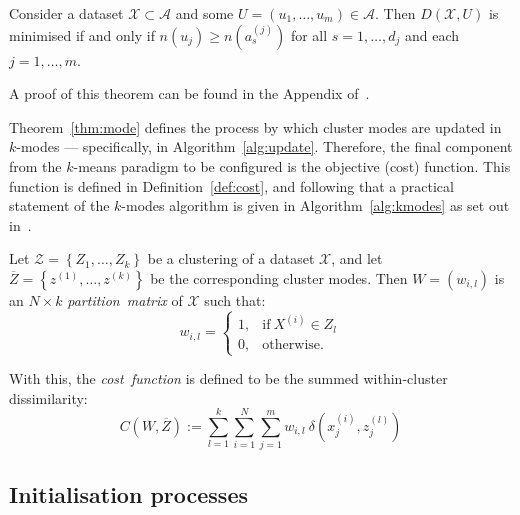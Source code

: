 \begin{theorem}\label{thm:mode}
    Consider a dataset \(\mathcal{X} \subset \mathcal{A}\) and some \(U = (u_1,
    \ldots, u_m) \in \mathcal{A}\). Then \(D(\mathcal{X}, U)\) is minimised if
    and only if \(n\left(u_j\right) \geq n\left(a_s^{(j)}\right)\) for all
    \(s=1, \ldots, d_j\) and each \(j = 1, \ldots, m\).

    A proof of this theorem can be found in the Appendix of~\cite{Huang1998}.
\end{theorem}

Theorem~\ref{thm:mode} defines the process by which cluster modes are updated in
\(k\)-modes --- specifically, in Algorithm~\ref{alg:update}. Therefore, the
final component from the \(k\)-means paradigm to be configured is the objective
(cost) function. This function is defined in Definition~\ref{def:cost}, and
following that a practical statement of the \(k\)-modes algorithm is given in
Algorithm~\ref{alg:kmodes} as set out in~\cite{Huang1998}.

\begin{definition}\label{def:cost}
    Let \(\mathcal{Z} = \left\{Z_1, \ldots, Z_k\right\}\) be a clustering of a
    dataset \(\mathcal{X}\), and let \(\overline Z = \left\{z^{(1)},
    \ldots, z^{(k)}\right\}\) be the corresponding cluster modes. Then \(W =
    \left(w_{i, l}\right)\) is an \(N \times k\) \emph{partition~matrix} of
    \(\mathcal{X}\) such that:
    \[
        w_{i, l} = \begin{cases}
                     1, & \text{if} \ X^{(i)} \in Z_l\\
                     0, & \text{otherwise.}
                   \end{cases}
    \]

    With this, the \emph{cost~function} is defined to be the summed
    within-cluster dissimilarity:
    \begin{equation}\label{eq:cost}
        C\left(W, \overline Z\right) := \sum_{l=1}^{k} \sum_{i=1}^{N}
        \sum_{j=1}^{m} w_{i,l} \ \delta\left(x_j^{(i)}, z_j^{(l)}\right)
    \end{equation}
\end{definition}


\subsection{Initialisation processes}\label{subsec:inits}


